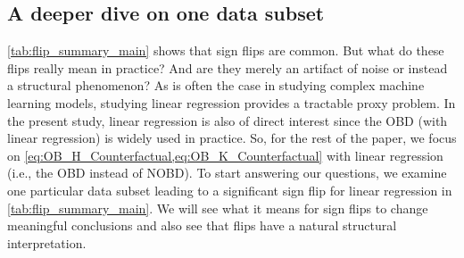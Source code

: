


\subsection{A deeper dive on one data subset}

\cref{tab:flip_summary_main} shows that sign flips are common.
But what do these flips really mean in practice?
And are they merely an artifact of noise or instead a structural phenomenon?
As is often the case in studying complex machine learning models, studying linear regression provides a tractable proxy problem.
In the present study, linear regression is also of direct interest since the OBD (with linear regression) is widely used in practice.
So, for the rest of the paper, we focus on \cref{eq:OB_H_Counterfactual,eq:OB_K_Counterfactual} with linear regression (i.e., the OBD instead of NOBD).
To start answering our questions, we examine one particular data subset leading to a significant sign flip for linear regression in \cref{tab:flip_summary_main}.
We will see what it means for sign flips to change meaningful conclusions and also see that flips have a natural structural interpretation.

